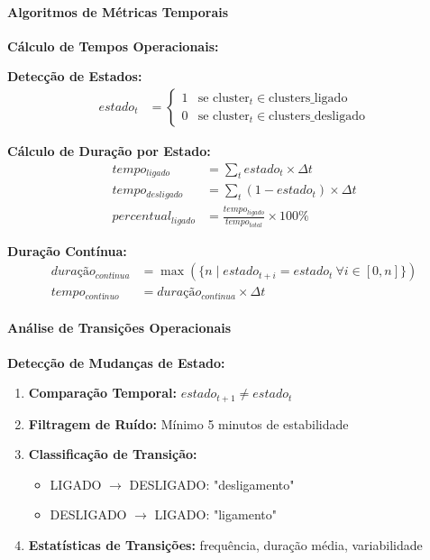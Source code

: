\paragraph{Algoritmos de Métricas Temporais}

\textbf{Cálculo de Tempos Operacionais:}

\textbf{Detecção de Estados:}
\begin{align}
estado_t &= \begin{cases}
1 & \text{se cluster}_t \in \text{clusters\_ligado} \\
0 & \text{se cluster}_t \in \text{clusters\_desligado}
\end{cases}
\end{align}

\textbf{Cálculo de Duração por Estado:}
\begin{align}
tempo_{ligado} &= \sum_{t} estado_t \times \Delta t \\
tempo_{desligado} &= \sum_{t} (1 - estado_t) \times \Delta t \\
percentual_{ligado} &= \frac{tempo_{ligado}}{tempo_{total}} \times 100\%
\end{align}

\textbf{Duração Contínua:}
\begin{align}
duração_{contínua} &= \max(\{n \mid estado_{t+i} = estado_t \ \forall i \in [0,n]\}) \\
tempo_{contínuo} &= duração_{contínua} \times \Delta t
\end{align}

\paragraph{Análise de Transições Operacionais}

\textbf{Detecção de Mudanças de Estado:}

\begin{enumerate}
    \item \textbf{Comparação Temporal:} $estado_{t+1} \neq estado_t$
    \item \textbf{Filtragem de Ruído:} Mínimo 5 minutos de estabilidade
    \item \textbf{Classificação de Transição:}
    \begin{itemize}
        \item LIGADO $\rightarrow$ DESLIGADO: "desligamento"
        \item DESLIGADO $\rightarrow$ LIGADO: "ligamento"
    \end{itemize}
    \item \textbf{Estatísticas de Transições:} frequência, duração média, variabilidade
\end{enumerate}

